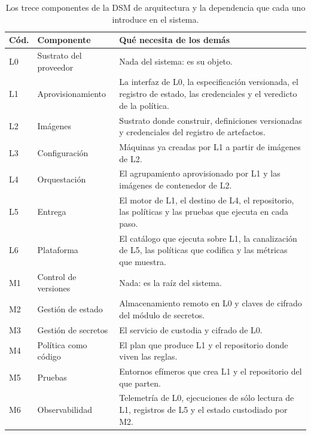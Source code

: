 \documentclass[11pt,letterpaper]{article}
\begin{document}
\begin{table}[ht]
  \centering
  \footnotesize
  \caption{Los trece componentes de la DSM de arquitectura y la dependencia
  que cada uno introduce en el sistema.}
  \label{tab:dsmelem}
  \begin{tabularx}{\textwidth}{@{}l>{\raggedright\arraybackslash}p{}
    >{\raggedright\arraybackslash}X@{}}
    \toprule
    \textbf{Cód.} & \textbf{Componente} & \textbf{Qué necesita de los demás} \\
    \midrule
    L0 & Sustrato del proveedor & Nada del sistema: es su objeto. \\
    L1 & Aprovisionamiento & La interfaz de L0, la especificación versionada,
         el registro de estado, las credenciales y el veredicto de la
         política. \\
    L2 & Imágenes & Sustrato donde construir, definiciones versionadas y
         credenciales del registro de artefactos. \\
    L3 & Configuración & Máquinas ya creadas por L1 a partir de imágenes de
         L2. \\
    L4 & Orquestación & El agrupamiento aprovisionado por L1 y las imágenes de
         contenedor de L2. \\
    L5 & Entrega & El motor de L1, el destino de L4, el repositorio, las
         políticas y las pruebas que ejecuta en cada paso. \\
    L6 & Plataforma & El catálogo que ejecuta sobre L1, la canalización de L5,
         las políticas que codifica y las métricas que muestra. \\
    M1 & Control de versiones & Nada: es la raíz del sistema. \\
    M2 & Gestión de estado & Almacenamiento remoto en L0 y claves de cifrado
         del módulo de secretos. \\
    M3 & Gestión de secretos & El servicio de custodia y cifrado de L0. \\
    M4 & Política como código & El plan que produce L1 y el repositorio donde
         viven las reglas. \\
    M5 & Pruebas & Entornos efímeros que crea L1 y el repositorio del que
         parten. \\
    M6 & Observabilidad & Telemetría de L0, ejecuciones de sólo lectura de L1,
         registros de L5 y el estado custodiado por M2. \\
    \bottomrule
  \end{tabularx}
\end{table}
\end{document}
